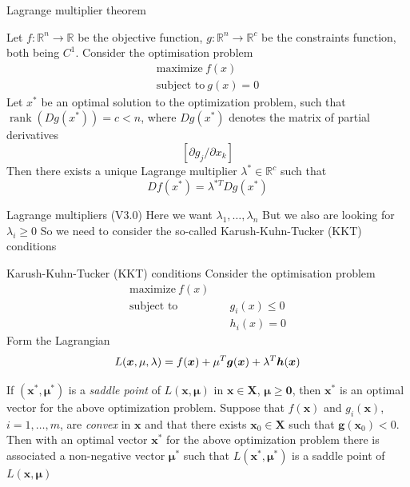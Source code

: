 \documentclass[aspectratio=169]{beamer}\usepackage[]{graphicx}\usepackage[]{xcolor}
\begin{document}
\begin{frame}{Lagrange multiplier theorem}
    \begin{theorem}
        Let $f\colon\mathbb{R}^n \rightarrow \mathbb{R}$ be the objective function, $g\colon\mathbb{R}^n \rightarrow \mathbb{R}^c $ be the constraints function, both being $C^1$.
        Consider the optimisation problem
        \begin{align*}
            \text{maximize}\ f(x) \\
            \text{subject to}\ g(x) = 0                 
        \end{align*}
        Let $x^*$ be an optimal solution to the optimization problem, such that $\operatorname{rank} (Dg(x^*)) = c < n$, where $Dg(x^*)$ denotes the matrix of partial derivatives
        \[
            \left[{\partial g_j}/{\partial x_k}\right]  
        \]
        Then there exists a unique Lagrange multiplier $\lambda^* \in \mathbb{R}^c$ such that
        \[
            Df(x^*) = \lambda^{*T}Dg(x^*)
        \]
    \end{theorem}
\end{frame}

\begin{frame}{Lagrange multipliers (V3.0)}
    Here we want $\lambda_1,\ldots,\lambda_n$
    \vfill
    But we also are looking for $\lambda_i\geq 0$
    \vfill 
    So we need to consider the so-called Karush-Kuhn-Tucker (KKT) conditions
\end{frame}

\begin{frame}{Karush-Kuhn-Tucker (KKT) conditions}
    Consider the optimisation problem
    \begin{align*}
        \text{maximize}\ f(x) \\
        \text{subject to}& \quad g_i(x) \leq 0  \\
        &\quad h_i(x)=0               
    \end{align*}
    Form the Lagrangian
    \[
        L(\bm{x},\mu,\lambda) = f(\bm{x})+\mu^T\bm{g}(\bm{x})+\lambda^T\bm{h}(\bm{x})
    \]
    \begin{theorem}
        If $(\mathbf{x}^{\ast},\mathbf{\mu}^\ast)$ is a \emph{saddle point} of $L(\mathbf{x},\mathbf{\mu})$ in $\mathbf{x} \in \mathbf{X}$, $\mathbf{\mu} \geq \mathbf{0}$, then $\mathbf{x}^{\ast}$ is an optimal vector for the above optimization problem. Suppose that $f(\mathbf{x})$ and $g_i(\mathbf{x})$, $i = 1, \ldots, m$, are \emph{convex} in $\mathbf{x}$ and that there exists $\mathbf{x}_{0} \in \mathbf{X}$ such that $\mathbf{g}(\mathbf{x}_{0}) < 0$. Then with an optimal vector $\mathbf{x}^{\ast}$ for the above optimization problem there is associated a non-negative vector $\mathbf{\mu}^\ast$ such that $L(\mathbf{x}^{\ast},\mathbf{\mu}^\ast)$ is a saddle point of $L(\mathbf{x},\mathbf{\mu})$
    \end{theorem}
\end{frame}
\end{document}
